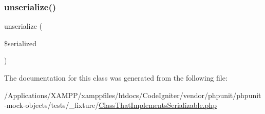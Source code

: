 \mbox{\label{class_class_that_implements_serializable_ac2f3a0997c46fd9bb24fe4190f738eb0}} 
\subsubsection{\texorpdfstring{unserialize()}{unserialize()}}
{\footnotesize\ttfamily unserialize (\begin{DoxyParamCaption}\item[{}]{\$serialized }\end{DoxyParamCaption})}



The documentation for this class was generated from the following file\+:\begin{DoxyCompactItemize}
\item 
/\+Applications/\+X\+A\+M\+P\+P/xamppfiles/htdocs/\+Code\+Igniter/vendor/phpunit/phpunit-\/mock-\/objects/tests/\+\_\+fixture/\mbox{\hyperlink{_class_that_implements_serializable_8php}{Class\+That\+Implements\+Serializable.\+php}}\end{DoxyCompactItemize}
